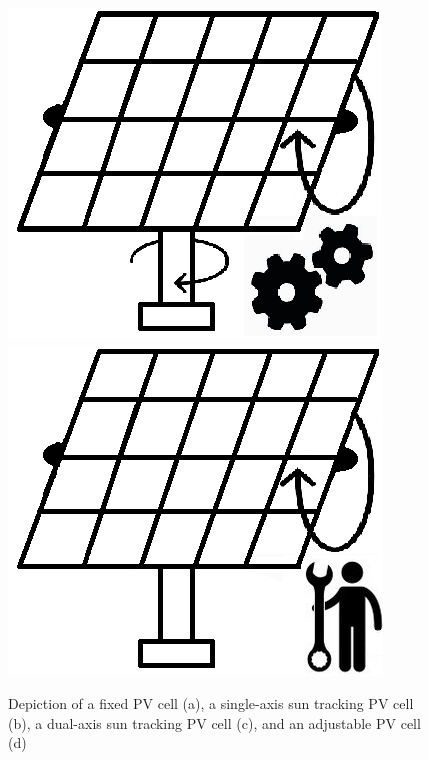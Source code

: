 \begin{figure}[H]
  \includegraphics[width=\textwidth]{pictures/k3.png}
\subcaption{\label{3}}
\endminipage
{}
  \includegraphics[width=\textwidth]{pictures/k5.png}
\subcaption{\label{4}}
\endminipage
\caption[Depiction of a fixed PV cell, a single-axis sun tracking PV cell, a dual-axis sun tracking PV cell, and an adjustable PV cell]{Depiction of a fixed PV cell (a), a single-axis sun tracking PV cell (b), a dual-axis sun tracking PV cell (c), and an adjustable PV cell (d) \label{ar}}
\end{figure}










